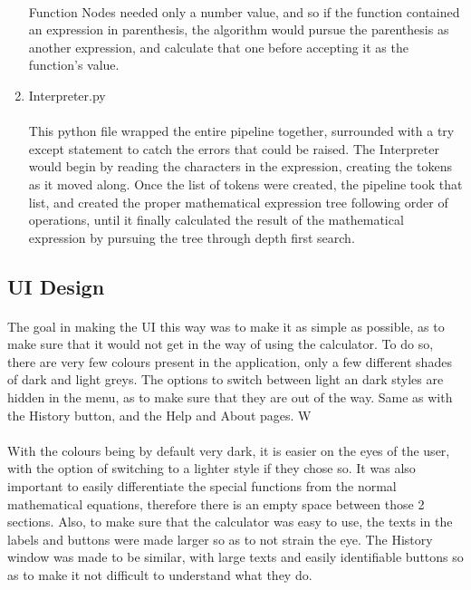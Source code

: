 \begin{enumerate}
            \paragraph{}
            Function Nodes needed only a number value, and so if the function contained an expression in parenthesis, the algorithm would pursue the parenthesis as another expression, and calculate that one before accepting it as the function’s value.

            \item Interpreter.py
            \paragraph{}
            This python file wrapped the entire pipeline together, surrounded with a try except statement to catch the errors that could be raised. The Interpreter would begin by reading the characters in the expression, creating the tokens as it moved along. Once the list of tokens were created, the pipeline took that list, and created the proper mathematical expression tree following order of operations, until it finally calculated the result of the mathematical expression by pursuing the tree through depth first search.
        \end{enumerate}

    \subsection{UI Design}
    \paragraph{}
    The goal in making the UI this way was to make it as simple as possible, as to make sure that it would not get in the way of using the calculator. To do so, there are very few colours present in the application, only a few different shades of dark and light greys. The options to switch between light an dark styles are hidden in the menu, as to make sure that they are out of the way. Same as with the History button, and the Help and About pages. W

    \paragraph{}
    With the colours being by default very dark, it is easier on the eyes of the user, with the option of switching to a lighter style if they chose so. It was also important to easily differentiate the special functions from the normal mathematical equations, therefore there is an empty space between those 2 sections. Also, to make sure that the calculator was easy to use, the texts in the labels and buttons were made larger so as to not strain the eye. The History window was made to be similar, with large texts and easily identifiable buttons so as to make it not difficult to understand what they do.


